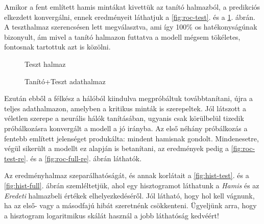 \label{sec:eredmenyek.100}
Amikor a fent említett hamis mintákat kivettük az tanító halmazból, a predikciós elkezdett konvergálni,
ennek eredményeit láthatjuk a \ref{fig:roc-test}. és a \ref{fig:roc-full}. ábrán. A teszthalmaz szerencsésen
lett megválasztva, ami így 100\% os hatékonyságúnak bizonyult, ám mivel a tanító halmazon 
futtatva a modell mégsem tökéletes, fontosnak tartottuk azt is közölni. 



\begin{figure}[ht]
	

	\begin{minipage}[c]{0.5\linewidth}
		
		\caption{Teszt halmaz}
		\label{fig:roc-test}

	\end{minipage}\hfill
	\begin{minipage}[c]{0.5\linewidth}
		
		\caption{Tanító+Teszt adathalmaz}
		\label{fig:roc-full}
		
	\end{minipage}
\end{figure}


Ezután ebből a félkész a hálóból kiindulva megpróbáltuk továbbtanítani, újra a teljes adathalmazon,
amelyben a kritikus minták is szerepeltek. Jól látszott a véletlen szerepe a neurális 
hálók tanításában, ugyanis csak körülbelül tizedik próbálkozásra konvergált a modell a
jó irányba. Az első néhány próbálkozás a fentebb említett jelenséget produkálta: mindent 
hamisnak gondolt. Mindenesetre, végül sikerült a modellt ez alapján is betanítani, az 
eredmények pedig a \ref{fig:roc-test-re}. és a \ref{fig:roc-full-re}. ábrán láthatók.


Az eredményhalmaz szeparálhatóságát, és annak korlátait a \ref{fig:hist-test}. és a \ref{fig:hist-full}.
ábrán szemléltetjük, ahol egy hisztogramot láthatunk a \textit{Hamis} és az \textit{Eredeti}
halmazbeli értékek elhelyezkedéséről. Jól látható, hogy hol kell vágnunk, ha az 
első- vagy a másodfajú hibát szeretnénk csökkenteni. Ügyeljünk arra, hogy a hisztogram
logaritmikus skálát használ a jobb láthatóság kedvéért!


